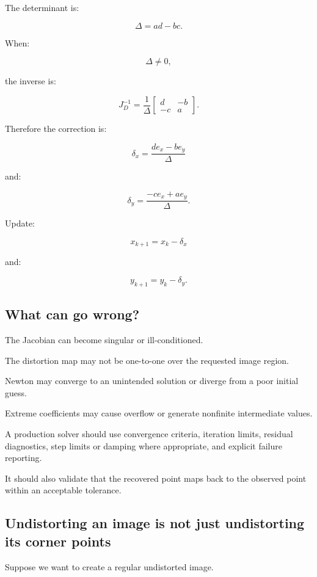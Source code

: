 The determinant is:

\[
 \boxed{ \Delta=ad-bc }.
\]

When:

\[
 \Delta\ne0,
\]

the inverse is:

\[
 J_D^{-1} = \frac1\Delta \begin{bmatrix} d&-b\\ -c&a \end{bmatrix}.
\]

Therefore the correction is:

\[
 \boxed{ \delta_x= \frac{de_x-be_y}{\Delta} }
\]

and:

\[
 \boxed{ \delta_y= \frac{-ce_x+ae_y}{\Delta} }.
\]

Update:

\[
 \boxed{ x_{k+1}=x_k-\delta_x }
\]

and:

\[
 \boxed{ y_{k+1}=y_k-\delta_y }.
\]

\subsection{What can go wrong?}\label{02-foundations-ii-ch035-what-can-go-wrong}

The Jacobian can become singular or ill-conditioned.

The distortion map may not be one-to-one over the requested image region.

Newton may converge to an unintended solution or diverge from a poor initial guess.

Extreme coefficients may cause overflow or generate nonfinite intermediate values.

A production solver should use convergence criteria, iteration limits, residual diagnostics, step limits or damping where appropriate, and explicit failure reporting.

It should also validate that the recovered point maps back to the observed point within an acceptable tolerance.

\subsection{Undistorting an image is not just undistorting its corner points}\label{02-foundations-ii-ch035-undistorting-an-image-is-not-just-undistorting-its-corner-points}

Suppose we want to create a regular undistorted image.

